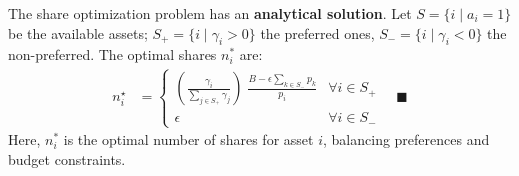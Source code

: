 \documentclass[aspectratio=169]{beamer}
\begin{document}
\begin{frame}
The share optimization problem has an \textbf{analytical solution}. 
Let $S = \{i \mid a_i = 1\}$ be the available assets; $S_+ = \{i \mid \gamma_i > 0\}$ the preferred ones, $S_- = \{i \mid \gamma_i < 0\}$ the non-preferred.
The optimal shares $n_i^*$ are:
\begin{align*}
n_{i}^{\star} & = \begin{cases}
\left(\frac{\gamma_{i}}{\sum_{j\in{S}_{+}}\gamma_{j}}\right)\;\frac{B - \epsilon\sum_{k\in{S}_{-}}p_{k}}{p_{i}} & \forall{i}\in{S}_{+}\\
\epsilon & \forall{i}\in{S}_{-}
\end{cases}\quad\blacksquare    
\end{align*}
Here, $n_i^*$ is the optimal number of shares for asset $i$, balancing preferences and budget constraints.
\end{frame}
\end{document}
